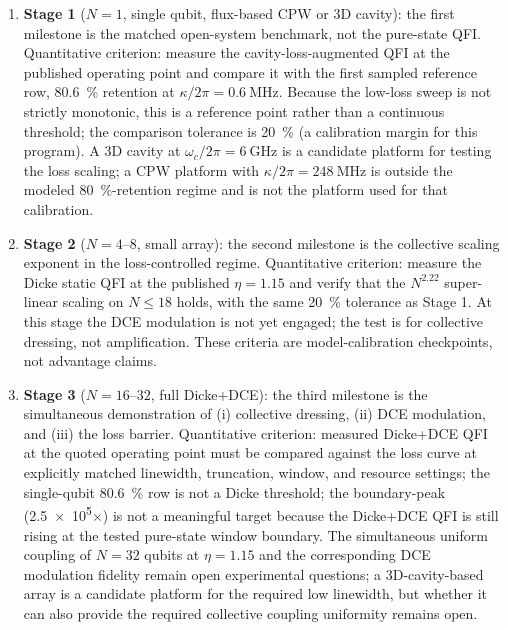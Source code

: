 \documentclass[aps,prxquantum,preprint,superscriptaddress,amsmath,amssymb]{revtex4-2}
\begin{document}
\begin{enumerate}
    \item \textbf{Stage \num{1}} ($N = \num{1}$, single qubit, flux-based CPW or 3D cavity): the first milestone is the matched open-system benchmark, not the pure-state QFI. Quantitative criterion: measure the cavity-loss-augmented QFI at the published operating point and compare it with the first sampled reference row, \qty{80.6}{\percent} retention at $\kappa/2\pi=\qty{0.6}{\mega\hertz}$. Because the low-loss sweep is not strictly monotonic, this is a reference point rather than a continuous threshold; the comparison tolerance is \qty{20}{\percent} (a calibration margin for this program). A 3D cavity at $\omega_c/2\pi = \qty{6}{\giga\hertz}$ is a candidate platform for testing the loss scaling; a CPW platform with $\kappa/2\pi = \qty{248}{\mega\hertz}$ is outside the modeled \qty{80}{\percent}-retention regime and is not the platform used for that calibration.
    \item \textbf{Stage \num{2}} ($N = \numrange{4}{8}$, small array): the second milestone is the collective scaling exponent in the loss-controlled regime. Quantitative criterion: measure the Dicke static QFI at the published $\eta = \num{1.15}$ and verify that the $N^{\num{2.22}}$ super-linear scaling on $N \le \num{18}$ holds, with the same \qty{20}{\percent} tolerance as Stage \num{1}. At this stage the DCE modulation is not yet engaged; the test is for collective dressing, not amplification. These criteria are model-calibration checkpoints, not advantage claims.
    \item \textbf{Stage \num{3}} ($N = \numrange{16}{32}$, full Dicke+DCE): the third milestone is the simultaneous demonstration of (i) collective dressing, (ii) DCE modulation, and (iii) the loss barrier. Quantitative criterion: measured Dicke+DCE QFI at the quoted operating point must be compared against the loss curve at explicitly matched linewidth, truncation, window, and resource settings; the single-qubit \qty{80.6}{\percent} row is not a Dicke threshold; the boundary-peak (\num{2.5e5}$\times$) is not a meaningful target because the Dicke+DCE QFI is still rising at the tested pure-state window boundary. The simultaneous uniform coupling of $N = \num{32}$ qubits at $\eta = \num{1.15}$ and the corresponding DCE modulation fidelity remain open experimental questions; a 3D-cavity-based array is a candidate platform for the required low linewidth, but whether it can also provide the required collective coupling uniformity remains open.
\end{enumerate}
\end{document}
